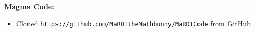 \textbf{Magma Code:}
\begin{itemize}
\item Cloned \verb|https://github.com/MaRDItheMathbunny/MaRDICode| from GitHub
\end{itemize}